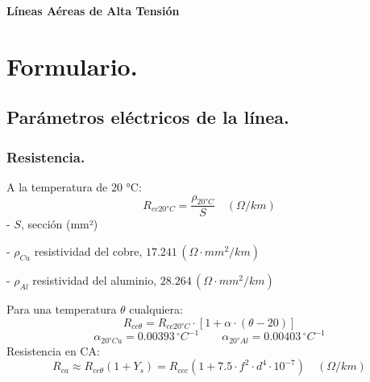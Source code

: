 \documentclass[12pt,a4paper]{article}
\begin{document}
	
	\begin{titlepage} %
		\centering
		\vspace*{2cm} %
		{\Huge \textbf{Líneas Aéreas de Alta Tensión}}\\[1cm] %
		\vfill %
		\vspace*{2cm} %
	\end{titlepage}

\section{Formulario.}
\subsection{Parámetros eléctricos de la línea.}
\subsubsection{Resistencia.}	
A la temperatura de 20 °C:
\[
\boxed{R_{cc20°C} = \frac{\rho_{20°C}}{S} \quad (\Omega/km)}
\]
- \( S \), sección (mm²)

- \( \rho_{Cu} \) resistividad del cobre, \( 17.241 \, (\Omega \cdot mm^2/km) \)

- \( \rho_{Al} \) resistividad del aluminio, \( 28.264 \, (\Omega \cdot mm^2/km) \)
\vspace{0.2cm}

Para una temperatura \(\theta\) cualquiera:
\[
\boxed{R_{cc\theta} = R_{cc20°C} \cdot [1 + \alpha \cdot (\theta - 20)]}
\]
\[
\alpha_{20°Cu} = 0.00393 \, ^\circ C^{-1} \qquad \alpha_{20°Al} = 0.00403 \, ^\circ C^{-1}
\]
Resistencia en CA:
\[
\boxed{R_{ca} \approx R_{cc\theta} (1 + Y_s) = R_{ccc} \left( 1 + 7.5 \cdot f^2 \cdot d^4 \cdot 10^{-7} \right) \quad (\Omega / km)}
\]
\end{document}
